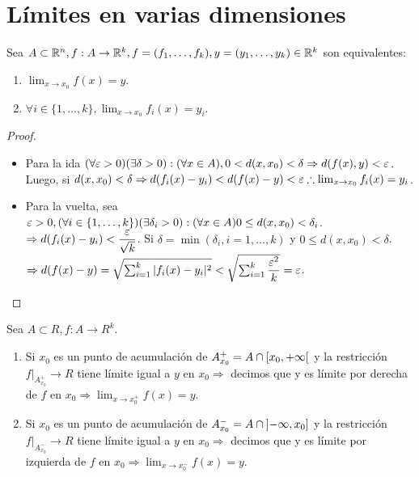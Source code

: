 \section{Límites en varias dimensiones}

\begin{prop}
  Sea \(A \subset \mathbb{R}^n, f: A \to \mathbb{R}^k, f=(f_1, \ldots, f_k), y = (y_1, \ldots, y_k) \in \mathbb{R}^k\) son equivalentes:
  \begin{enumerate}
    \item \(\lim_{x \to x_0} f(x) = y\).
    \item \(\forall i \in \{1, \ldots, k\}, \lim_{x \to x_0} f_i(x) = y_i\).
  \end{enumerate}
  \begin{proof}
    \begin{itemize}
      \item Para la ida \((\forall \varepsilon > 0)(\exists \delta > 0) : (\forall x \in A), 0 < d(x, x_0) < \delta \Rightarrow d(f(x), y) < \varepsilon \). Luego, si \(d(x, x_0) < \delta \Rightarrow d(f_i(x) - y_i) < d(f(x) - y) < \varepsilon \therefore \lim_{x \to x_0} f_i(x) = y_i\).
      \item Para la vuelta, sea \(\varepsilon > 0, (\forall i \in \{1, \ldots, k\})(\exists \delta_i > 0) : (\forall x \in A) 0 \leq d(x, x_0) < \delta_i\). \\
            \(\Rightarrow d(f_i(x) - y_i) < \dfrac{\varepsilon}{\sqrt{k}} \). Si \(\delta = \min(\delta_i, i = 1, \ldots, k)\) y \(0 \leq d(x, x_0) < \delta \).
            \(\Rightarrow d(f(x) - y) = \sqrt{\sum_{i = 1}^k | f_i(x) - y_i |^2 } < \sqrt{\sum_{i = 1}^k \dfrac{\varepsilon^2}{k}} = \varepsilon \).
    \end{itemize}
  \end{proof}
\end{prop}

\begin{definition}
  Sea \(A \subset R, f: A \to R^k\).
  \begin{enumerate}
    \item Si \(x_0\) es un punto de acumulación de \(A_{x_0}^{+} = A \cap \interval[open right]{x_0}{+\infty} \) y la restricción \(f|_{A_{x_0}^{+}} \to R\) tiene límite igual a \(y\) en \(x_0 \Rightarrow \) decimos que y es límite por derecha de \(f\) en \(x_0 \Rightarrow \lim_{x \to x_0^+} f(x) = y\).
    \item Si \(x_0\) es un punto de acumulación de \(A_{x_0}^{-} = A \cap \interval[open left]{-\infty}{x_0} \) y la restricción \(f|_{A_{x_0}^{-}} \to R\) tiene límite igual a \(y\) en \(x_0 \Rightarrow \) decimos que y es límite por izquierda de \(f\) en \(x_0 \Rightarrow \lim_{x \to x_0^-} f(x) = y\).
  \end{enumerate}
\end{definition}

